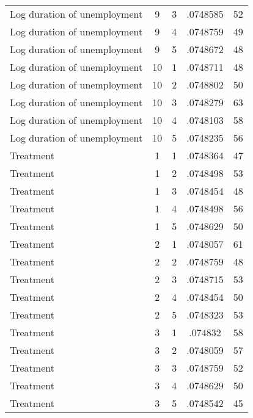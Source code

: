 \begin{tabular}{l*{4}{c}}
Log duration of unemployment&           9&           3&    .0748585&          52\\
Log duration of unemployment&           9&           4&    .0748759&          49\\
Log duration of unemployment&           9&           5&    .0748672&          48\\
Log duration of unemployment&          10&           1&    .0748711&          48\\
Log duration of unemployment&          10&           2&    .0748802&          50\\
Log duration of unemployment&          10&           3&    .0748279&          63\\
Log duration of unemployment&          10&           4&    .0748103&          58\\
Log duration of unemployment&          10&           5&    .0748235&          56\\
Treatment           &           1&           1&    .0748364&          47\\
Treatment           &           1&           2&    .0748498&          53\\
Treatment           &           1&           3&    .0748454&          48\\
Treatment           &           1&           4&    .0748498&          56\\
Treatment           &           1&           5&    .0748629&          50\\
Treatment           &           2&           1&    .0748057&          61\\
Treatment           &           2&           2&    .0748759&          48\\
Treatment           &           2&           3&    .0748715&          53\\
Treatment           &           2&           4&    .0748454&          50\\
Treatment           &           2&           5&    .0748323&          53\\
Treatment           &           3&           1&     .074832&          58\\
Treatment           &           3&           2&    .0748059&          57\\
Treatment           &           3&           3&    .0748759&          52\\
Treatment           &           3&           4&    .0748629&          50\\
Treatment           &           3&           5&    .0748542&          45\\

\end{tabular}
